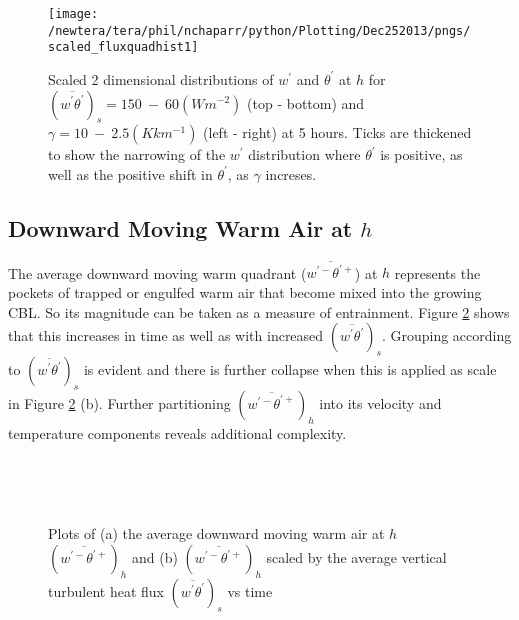 \begin{figure}[htbp]
\centering
 \texttt{[image: /newtera/tera/phil/nchaparr/python/Plotting/Dec252013/pngs/scaled\_fluxquadhist1]}                 
\caption[Scaled 2D distributions of $w^{'}$ and $\theta^{'}$ for all runs]{Scaled 2 dimensional distributions of $w^{'}$ and $\theta^{'}$ at $h$ for $(\overline{w^{'}\theta^{'}})_{s} = 150 \ - \ 60 (Wm^{-2})$ (top - bottom) and $\gamma = 10 \ - \  2.5(Kkm^{-1})$ (left - right) at 5 hours. Ticks are thickened to show the narrowing of the $w^{'}$ distribution where $\theta^{'}$ is positive, as well as the positive shift in $\theta^{'}$, as $\gamma$ increses.}
\label{fig:scaled_fluxquadhs}
\end{figure}


\clearpage

\subsection{Downward Moving Warm Air at $h$}
\label{subsec:downwarm}

The average downward moving warm quadrant ($\overline{w^{'-}\theta^{'+}}$) at $h$ represents the pockets of trapped or engulfed warm air that become mixed into the growing \acs{CBL}.  So its magnitude can be taken as a measure of entrainment.  Figure \ref{fig:downwarm} shows that this increases in time as well as with increased $(\overline{w^{'}\theta^{'}})_{s}$.  Grouping according to $(\overline{w^{'}\theta^{'}})_{s}$ is evident and there is further collapse when this is applied as scale in Figure \ref{fig:downwarm} (b).  Further partitioning $(\overline{w^{'-}\theta^{'+}})_{h}$ into its velocity and temperature components reveals additional complexity.\\

\begin{figure}[htbp]
\begin{minipage}[b]{0.5\linewidth}
        \\
        \end{minipage}             
\quad
\begin{minipage}[b]{0.5\linewidth}
        \\
     
       \end{minipage}
        \caption[Downward moving warm air at $h$]{Plots of (a) the average downward moving warm air at $h$ $(\overline{w^{\prime-}\theta^{\prime+}})_{h}$ and (b) $(\overline{w^{\prime-}\theta^{\prime+}})_{h}$ scaled by the average vertical turbulent heat flux $ ( \overline{ w^{'} \theta^{'} } )_{s} $ vs time}
        \label{fig:downwarm}
\end{figure}

